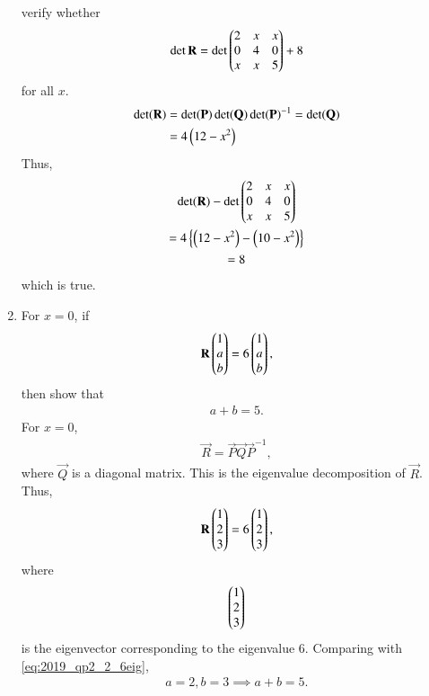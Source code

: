\begin{enumerate}[label=\arabic*.,ref=\thesubsection.\theenumi]
verify whether 
\begin{align}
\det{\mathbf{R}}= 
\det\begin{pmatrix}2 & x & x \\ 0 & 4 & 0 \\ x & x & 5\end{pmatrix} + 8
\end{align}
for all $x$.
\\
\solution 
\begin{align}
\det(\mathbf{R}) &= \det(\mathbf{P})\det(\mathbf{Q})\det(\mathbf{P})^{-1}=\det(\mathbf{Q})
\nonumber \\
&= 4\left(12-x^2\right)
\end{align}
%
Thus, 
\begin{multline}
\det(\mathbf{R}) - \det\begin{pmatrix}2 & x & x \\ 0 & 4 & 0 \\ x & x & 5\end{pmatrix}
\\
= 4\left\{\left(12-x^2\right)-\left(10-x^2\right)\right\}
\\
= 8
\end{multline}
%
which is true.
\item For $x= 0$, if 
\begin{align}
\label{eq:2019_qp2_2_ab}
\mathbf{R}\begin{pmatrix}1 \\ a \\ b\end{pmatrix} = 6\begin{pmatrix}1 \\ a \\ b\end{pmatrix}, 
\end{align}
%
then show that 
\begin{align}
a+b = 5.
\end{align}
\solution For $x=0$, 
\begin{align}
\vec{R} = \vec{P}\vec{Q}\vec{P}^{-1},
\end{align}
%
where $\vec{Q}$ is a diagonal matrix.  This is the eigenvalue decomposition of $\vec{R}$.  Thus, 
\begin{align}
\label{eq:2019_qp2_2_6eig}
\mathbf{R}\begin{pmatrix}1 \\ 2 \\ 3\end{pmatrix} = 6\begin{pmatrix}1 \\ 2 \\ 3\end{pmatrix}, 
\end{align}
%
where 
\begin{align}
\begin{pmatrix}1 \\ 2 \\ 3\end{pmatrix}
\end{align}
%
is the eigenvector corresponding to the eigenvalue $6$. Comparing with \eqref{eq:2019_qp2_2_6eig},
\begin{align}
a=2,b=3 \implies a+b = 5.
\end{align}
%

\end{enumerate}
